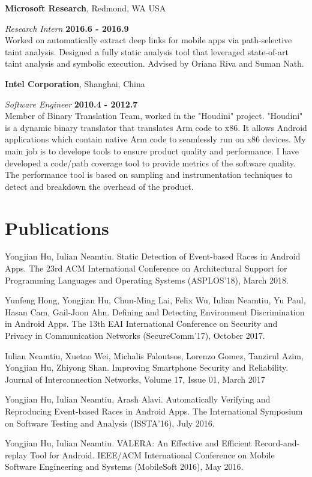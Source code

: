\documentclass[margin,line]{res}
\begin{document}
\begin{resume}
{\bf Microsoft Research}, Redmond, WA USA

\vspace{-.3cm}
{\em Research Intern} \hfill {\bf 2016.6 - 2016.9}\\
Worked on automatically extract deep links for mobile apps via path-selective taint analysis.
Designed a fully static analysis tool that leveraged state-of-art taint analysis and symbolic execution.
Advised by Oriana Riva and Suman Nath.

{\bf Intel Corporation}, Shanghai, China

\vspace{-.3cm}
{\em Software Engineer} \hfill {\bf 2010.4 - 2012.7}\\
Member of Binary Translation Team, worked in the "Houdini" project.
"Houdini" is a dynamic binary translator that translates Arm code to 
x86. It allows Android applications which contain native Arm code to 
seamlessly run on x86 devices. My main job is to develope tools to ensure 
product quality and performance. I have developed a code/path coverage 
tool to provide metrics of the software quality. The performance tool 
is based on sampling and instrumentation techniques to detect and 
breakdown the overhead of the product.


\section{\sc Publications}
Yongjian Hu, Iulian Neamtiu.
Static Detection of Event-based Races in Android Apps.
The 23rd ACM International Conference on Architectural Support for Programming Languages and Operating Systems (ASPLOS'18), March 2018.

Yunfeng Hong, Yongjian Hu, Chun-Ming Lai, Felix Wu, Iulian Neamtiu, Yu Paul, Hasan Cam, Gail-Joon Ahn.
Defining and Detecting Environment Discrimination in Android Apps.
The 13th EAI International Conference on Security and Privacy in Communication Networks (SecureComm'17), October 2017.

Iulian Neamtiu, Xuetao Wei, Michalis Faloutsos, Lorenzo Gomez, Tanzirul Azim, Yongjian Hu, Zhiyong Shan.
Improving Smartphone Security and Reliability.
Journal of Interconnection Networks, Volume 17, Issue 01, March 2017

Yongjian Hu, Iulian Neamtiu, Arash Alavi. Automatically Verifying and Reproducing Event-based Races in Android Apps.
The International Symposium on Software Testing and Analysis (ISSTA'16), July 2016.

Yongjian Hu, Iulian Neamtiu. VALERA: An Effective and Efficient Record-and-replay Tool for Android.
IEEE/ACM International Conference on Mobile Software Engineering and Systems (MobileSoft 2016), May 2016.


\end{resume}
\end{document}
